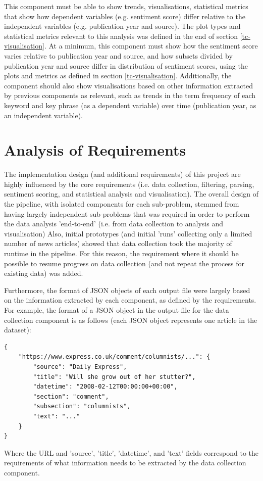 \documentclass{report}
\begin{document}
This component must be able to show trends, visualisations, statistical metrics that show how dependent variables (e.g. sentiment score) differ relative to the independent variables (e.g. publication year and source).
The plot types and statistical metrics relevant to this analysis was defined in the end of section \ref{tc-visualisation}.
At a minimum, this component must show how the sentiment score varies relative to publication year and source, and how subsets divided by publication year and source differ in distribution of sentiment scores, using the plots and metrics as defined in section \ref{tc-visualisation}.
Additionally, the component should also show visualisations based on other information extracted by previous components as relevant, such as trends in the term frequency of each keyword and key phrase (as a dependent variable) over time (publication year, as an independent variable).


\section{Analysis of Requirements} \label{Analysis of Requirements}

The implementation design (and additional requirements) of this project are highly influenced by the core requirements (i.e. data collection, filtering, parsing, sentiment scoring, and statistical analysis and visualisation).
The overall design of the pipeline, with isolated components for each sub-problem, stemmed from having largely independent sub-problems that was required in order to perform the data analysis 'end-to-end' (i.e. from data collection to analysis and visualisation)
Also, initial prototypes (and initial 'runs' collecting only a limited number of news articles) showed that data collection took the majority of runtime in the pipeline.
For this reason, the requirement where it should be possible to resume progress on data collection (and not repeat the process for existing data) was added.

Furthermore, the format of JSON objects of each output file were largely based on the information extracted by each component, as defined by the requirements.
For example, the format of a JSON object in the output file for the data collection component is as follows (each JSON object represents one article in the dataset):
\begin{lstlisting}
{
	"https://www.express.co.uk/comment/columnists/...": {
		"source": "Daily Express",
		"title": "Will she grow out of her stutter?",
		"datetime": "2008-02-12T00:00:00+00:00",
		"section": "comment",
		"subsection": "columnists",
		"text": "..."
	}
}
\end{lstlisting}
Where the URL and 'source', 'title', 'datetime', and 'text' fields correspond to the requirements of what information needs to be extracted by the data collection component.
\end{document}
